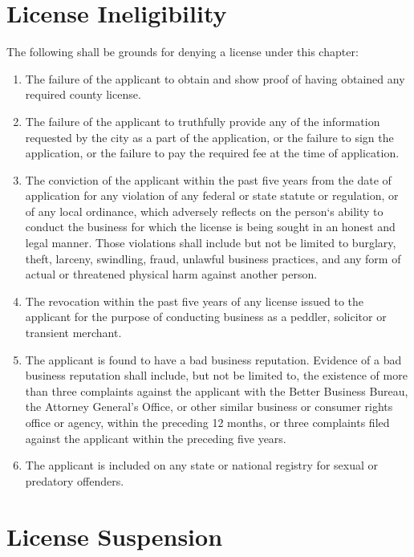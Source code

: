 \section{License Ineligibility}
The following shall be grounds for denying a license under this chapter:
\begin{enumerate}[{\indent}A)]
    \item The failure of the applicant to obtain and show proof of having obtained any required county license.
    \item The failure of the applicant to truthfully provide any of the information requested by the city as a part of the application, or the failure to sign the application, or the failure to pay the required fee at the time of application.
    \item The conviction of the applicant within the past five years from the date of application for any violation of any federal or state statute or regulation, or of any local ordinance, which adversely reflects on the person‘s ability to conduct the business for which the license is being sought in an honest and legal manner. Those violations shall include but not be limited to burglary, theft, larceny, swindling, fraud, unlawful business practices, and any form of actual or threatened physical harm against another person.
    \item The revocation within the past five years of any license issued to the applicant for the purpose of conducting business as a peddler, solicitor or transient merchant.
    \item The applicant is found to have a bad business reputation. Evidence of a bad business reputation shall include, but not be limited to, the existence of more than three complaints against the applicant with the Better Business Bureau, the Attorney General’s Office, or other similar business or consumer rights office or agency, within the preceding 12 months, or three complaints filed against the applicant within the preceding five years.
    \item The applicant is included on any state or national registry for sexual or predatory offenders.
\end{enumerate}

\section{License Suspension}
